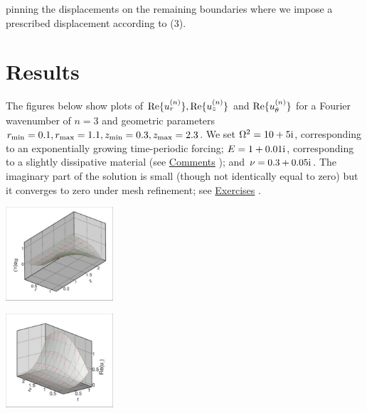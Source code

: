 pinning the displacements on the remaining boundaries where we impose a prescribed displacement according to (3).



 

\hypertarget{index_results}{}\section{Results}\label{index_results}
The figures below show plots of $ {\rm Re}\{u_r^{(n)}\}, {\rm Re}\{u_z^{(n)}\} $ and $ {\rm Re}\{u_\theta^{(n)}\} $ for a Fourier wavenumber of $ n=3 $ and geometric parameters $ r_{\rm min}=0.1, r_{\rm max}=1.1, z_{\rm min}=0.3, z_{\rm max}=2.3 $. We set $ \Omega^2=10+5{\rm i}$, corresponding to an exponentially growing time-\/periodic forcing; $ E=1+0.01{\rm i} $, corresponding to a slightly dissipative material (see \hyperlink{index_comments}{Comments} ); and $ \nu=0.3+0.05{\rm i}$. The imaginary part of the solution is small (though not identically equal to zero) but it converges to zero under mesh refinement; see \hyperlink{index_exercises}{Exercises} .

 
\begin{DoxyImage}
\includegraphics[width=0.3\textwidth]{validate_ur}
\end{DoxyImage}


 
\begin{DoxyImage}
\includegraphics[width=0.3\textwidth]{validate_uz}
\end{DoxyImage}


